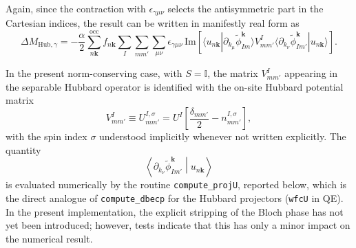 \documentclass[11pt]{article}
\begin{document}
Again, since the contraction with $\epsilon_{\gamma\mu\nu}$ selects the
antisymmetric part in the Cartesian indices, the result can be written
in manifestly real form as
\begin{equation}
\Delta M_{\mathrm{Hub},\gamma}
=
-\frac{\alpha}{2}
\sum_{n\mathbf{k}}^{\mathrm{occ}} f_{n\mathbf{k}}
\sum_I \sum_{mm'} \sum_{\mu\nu}
\epsilon_{\gamma\mu\nu}
\,\mathrm{Im}
\left[
\langle u_{n\mathbf{k}} |
\partial_{k_\mu} \widetilde{\phi}_{Im}^{\mathbf{k}} \rangle
V_{mm'}^I
\langle
\partial_{k_\nu} \widetilde{\phi}_{Im'}^{\mathbf{k}}
| u_{n\mathbf{k}} \rangle
\right] .
\label{eq:deltam_hub_final}
\end{equation}

In the present norm-conserving case, with \(S=\mathbb{I}\), the matrix \(V_{mm'}^I\) appearing in the separable Hubbard operator is identified with the on-site Hubbard potential matrix
\[
V_{mm'}^I \equiv U_{mm'}^{I,\sigma}
=
U^I \left[\frac{\delta_{mm'}}{2} - n_{mm'}^{I,\sigma}\right],
\]
with the spin index \(\sigma\) understood implicitly whenever not written explicitly.
\clearpage
The quantity
\[
\left\langle \partial_{k_\nu} \widetilde{\phi}_{Im'}^{\mathbf{k}} \middle| u_{n\mathbf{k}} \right\rangle
\]
is evaluated numerically by the routine \texttt{compute\_projU}, reported below, which is the direct analogue of \texttt{compute\_dbecp} for the Hubbard projectors (\texttt{wfcU} in QE). In the present implementation, the explicit stripping of the Bloch phase has not yet been introduced; however, tests indicate that this has only a minor impact on the numerical result.
\end{document}
